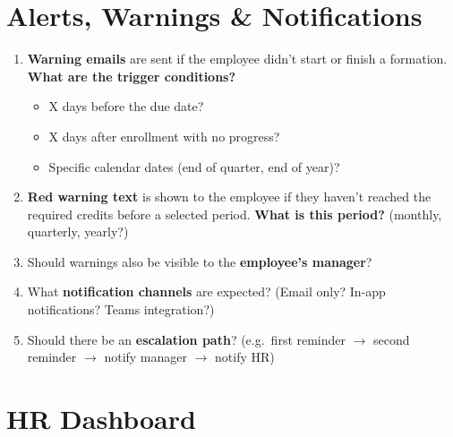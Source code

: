 \documentclass[11pt,a4paper]{article}
\begin{document}
\section{Alerts, Warnings \& Notifications}

\begin{enumerate}[leftmargin=2em]
  \item \textbf{Warning emails} are sent if the employee didn't start or finish a formation. \textbf{What are the trigger conditions?}
  \begin{itemize}[nosep]
    \item X days before the due date?
    \item X days after enrollment with no progress?
    \item Specific calendar dates (end of quarter, end of year)?
  \end{itemize}
  \item \textbf{Red warning text} is shown to the employee if they haven't reached the required credits before a selected period. \textbf{What is this period?} (monthly, quarterly, yearly?)
  \item Should warnings also be visible to the \textbf{employee's manager}?
  \item What \textbf{notification channels} are expected? (Email only? In-app notifications? Teams integration?)
  \item Should there be an \textbf{escalation path}? (e.g.\ first reminder $\rightarrow$ second reminder $\rightarrow$ notify manager $\rightarrow$ notify HR)
\end{enumerate}

\section{HR Dashboard}
\end{document}
